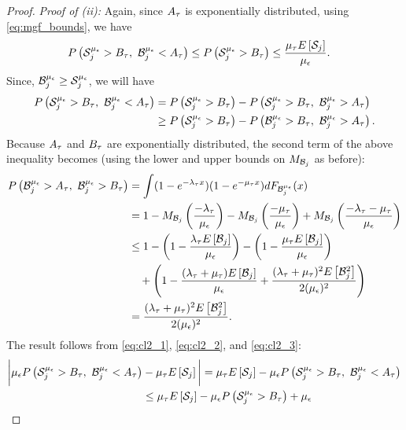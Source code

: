 \begin{proof}
	\noindent
	{\it Proof of (ii):}
        Again, since $A_{\tau}$ is exponentially distributed, using
        \eqref{eq:mgf_bounds}, we have
	\begin{align}
	\label{eq:cl2_1}
	\prob{\S^{\mue}_j > B_\t,\ \B^{\mue}_j < A_\t} & \leq \prob{\S^{\mue}_j
		> B_\t} \le  \frac{\mu_\t \Exp{\S_j}}{\mue}. %
	\end{align}
	 Since, $\mathcal{B}^{\mu_\epsilon}_j \ge  \mathcal{S}^{\mu_\epsilon}_j$, we will have
	\begin{align}
	P\left(\mathcal{S}^{{\mu_\epsilon}}_j > B_{\tau},\ \mathcal{B}^{{\mu_\epsilon}}_j < A_{\tau}\right) & = P\left(\mathcal{S}^{{\mu_\epsilon}}_j >
		B_{\tau}\right) - P\left( \mathcal{S}^{{\mu_\epsilon}}_j > B_{\tau},\ \mathcal{B}^{{\mu_\epsilon}}_j > A_{\tau}\right) \nonumber \\
	& \geq P\left(\mathcal{S}^{{\mu_\epsilon}}_j > B_{\tau}\right) - P\left(\mathcal{B}^{{\mu_\epsilon}}_j > B_{\tau},\ \mathcal{B}^{{\mu_\epsilon}}_j > A_{\tau}
		\right). \label{eq:cl2_2}
	\end{align} Because  $A_{\tau}$ and $B_{\tau}$ are exponentially distributed, the second term of the above inequality becomes (using the lower and upper bounds on $M_{\mathcal{B}_j}$ as before):
	\begin{align}
	P\left(\mathcal{B}^{{\mu_\epsilon}}_j > A_{\tau},\ \mathcal{B}^{{\mu_\epsilon}}_j > B_{\tau}\right) &=\int
	(1-e^{-\lambda_{\tau} x})(1-e^{-\mu_{\tau} x}) dF_{\mathcal{B}^{{\mu_\epsilon}}_j}(x) \nonumber \\
	&= 1 - M_{\mathcal{B}_j}\left(\frac{-\lambda_{\tau}}{{\mu_\epsilon}}\right) -
	M_{\mathcal{B}_j}\left(\frac{-\mu_{\tau}}{{\mu_\epsilon}}\right) +
	M_{\mathcal{B}_j}\left(\frac{-\lambda_{\tau} - \mu_{\tau}}{{\mu_\epsilon}}\right) \nonumber\\
&\le   1-  \left(1-\frac{\lambda_{\tau}E\left[\mathcal{B}_j\right]}{{\mu_\epsilon}} \right) 
	-  \left(1-\frac{\mu_{\tau}E\left[\mathcal{B}_j\right]}{{\mu_\epsilon}} \right )  \nonumber  \\
	&\quad + \left(1-\frac{(\lambda_{\tau}+ \mu_{\tau})E\left[\mathcal{B}_j\right]}{{\mu_\epsilon}}  + \frac{(\lambda_{\tau}+ \mu_{\tau})^2E\left[\mathcal{B}^2_j\right]}{2 ({\mu_\epsilon})^2}\right) \nonumber \\	
	&=  \frac{(\lambda_{\tau}+ \mu_{\tau})^2E\left[\mathcal{B}^2_j\right]}{2 ({\mu_\epsilon})^2} 
	 \label{eq:cl2_3}.
	\end{align}
	The result follows from \eqref{eq:cl2_1}, \eqref{eq:cl2_2}, and
	\eqref{eq:cl2_3}:
	\begin{align*}
	\bigg|\mue \prob{\S^{\mue}_j > B_\t,\ \B^{\mue}_j < A_\t} & - \mu_\t
	\Exp{\S_j}\bigg|  
	= \mu_\t \Exp{\S_j} - \mue \prob{\S^{\mue}_j > B_\t,\
		\B^{\mue}_j < A_\t} \\
	&\leq \mu_\t \Exp{\S_j} - \mue \prob{\S^{\mue}_j > B_\t} + \mue

\end{align*}
\end{proof}
